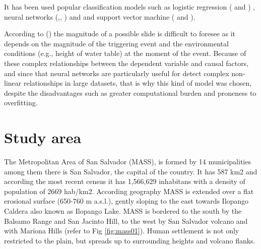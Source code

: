\documentclass[11pt,twoside]{rmta2010esp}%
\begin{document}
It has been used popular classification models such as logistic regression (\cite{akgun2012} and \cite{gaskill} ) , neural networks (\cite{Melchiorre2011410},\cite{Zeng2001374}, \cite{Ermini2005327}) and \cite{Yesilnacar2005251} and support vector machine (\cite{ballabio2012support} and \cite{tien2012landslide}). 


According to (\cite{van2006landslide}) the magnitude of a possible
slide is difficult to foresee as it depends on the magnitude of the triggering event and the environmental conditions (e.g., height of water table) at the moment of the event. Because of these complex relationships between the dependent variable and causal factors, and since that neural networks are particularly useful for detect complex non-linear relationships in large datasets, that is why this kind of model was chosen, despite the disadvantages such as greater computational burden and proneness to overfitting.  





\section{Study area}
\label{sec:studyarea}
The Metropolitan Area of San Salvador (MASS), is formed by 14 municipalities among them there is San Salvador, the capital of the country. It has 587 km2 and according the most recent census \cite{minecon} it has 1,566,629 inhabitans with a density of population of 2669 hab/km2.  According geography MASS is extended over a flat erosional surface (650-760 m a.s.l.), gently sloping to the east towards Ilopango Caldera also known as Ilopango Lake. MASS is bordered to the south by the Balsamo Range and San Jacinto Hill, to the west by San Salvador volcano and with Mariona Hills (refer to Fig \ref{fig:mass01}). Human settlement is not only restricted to the plain, but spreads up to surrounding heights and volcano flanks.
\end{document}

